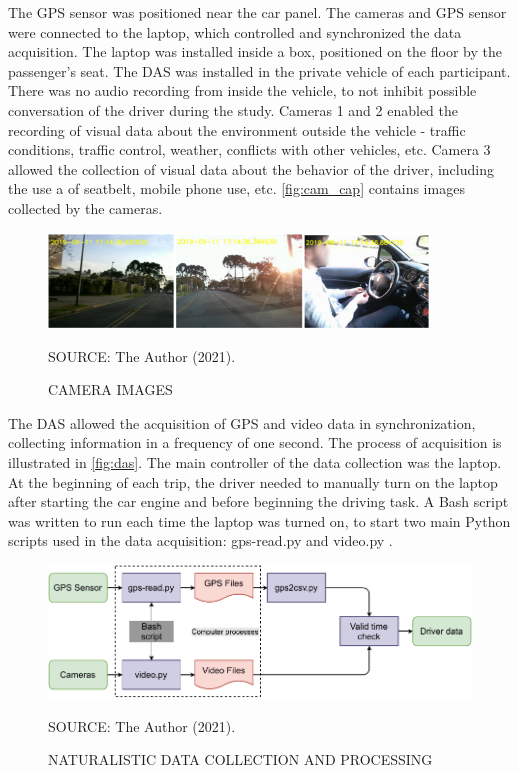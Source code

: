 The GPS sensor was positioned near the car panel. The cameras and GPS sensor were connected to the laptop, which controlled and synchronized the data acquisition. The laptop was installed inside a box, positioned on the floor by the passenger's seat. The DAS was installed in the private vehicle of each participant. There was no audio recording from inside the vehicle, to not inhibit possible conversation of the driver during the study. Cameras 1 and 2 enabled the recording of visual data about the environment outside the vehicle - traffic conditions, traffic control, weather, conflicts with other vehicles, etc. Camera 3 allowed the collection of visual data about the behavior of the driver, including the use a of seatbelt, mobile phone use, etc. \autoref{fig:cam_cap} contains images collected by the cameras.  

\begin{figure}[!htbp]
    \centering\footnotesize
    \captionsetup{font=footnotesize}
    \caption{CAMERA IMAGES}
    \includegraphics[width=0.9\textwidth]{fig/cam_cap.png}
    \label{fig:cam_cap}
    \par SOURCE: The Author (2021).
\end{figure}


The DAS allowed the acquisition of GPS and video data in synchronization, collecting information in a frequency of one second. The process of acquisition is illustrated in \autoref{fig:das}. The main controller of the data collection was the laptop. At the beginning of each trip, the driver needed to manually turn on the laptop after starting the car engine and before beginning the driving task. A Bash script was written to run each time the laptop was turned on, to start two main Python scripts used in the data acquisition: gps-read.py and video.py \cite{Borguezani2020}.  

\begin{figure}[!htbp]
    \centering\footnotesize
    \captionsetup{font=footnotesize}
    \caption{NATURALISTIC DATA COLLECTION AND PROCESSING}
    \includegraphics{fig/DAS.pdf}
    \label{fig:das}
    \par SOURCE: The Author (2021).
\end{figure}

